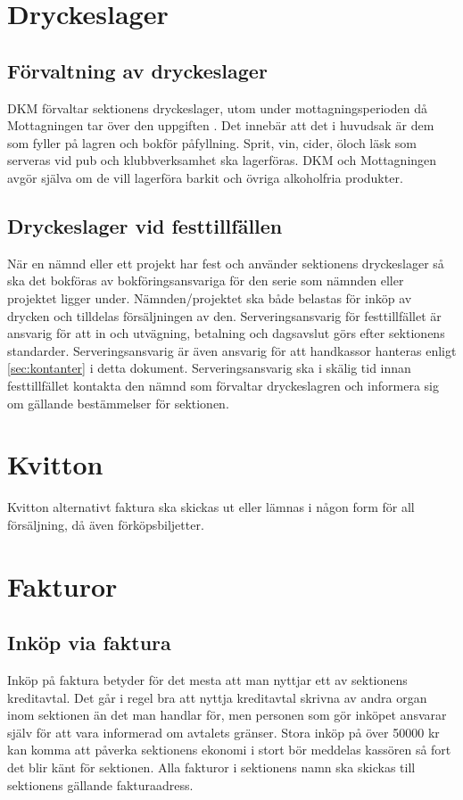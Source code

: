 \documentclass{dgovdoc}
\begin{document}
\section{Dryckeslager}
\subsection{Förvaltning av dryckeslager}
DKM förvaltar sektionens dryckeslager, utom under mottagningsperioden då Mottagningen tar över den
uppgiften . Det innebär att det i huvudsak är dem som fyller på lagren och bokför påfyllning. Sprit,
vin, cider, öloch läsk som serveras vid pub­ och klubbverksamhet ska lagerföras. DKM och Mottagningen avgör själva
om de vill lagerföra barkit och övriga alkoholfria produkter.

\subsection{Dryckeslager vid festtillfällen}
När en nämnd eller ett projekt har fest och använder sektionens dryckeslager så ska det bokföras av
bokföringsansvariga för den serie som nämnden eller projektet ligger under. Nämnden/projektet ska både
belastas för inköp av drycken och tilldelas försäljningen av den. Serveringsansvarig för festtillfället är
ansvarig för att in­ och ut­vägning, betalning och dagsavslut görs efter sektionens standarder.
Serveringsansvarig är även ansvarig för att handkassor hanteras enligt \ref{sec:kontanter} i detta dokument.
Serveringsansvarig ska i skälig tid innan festtillfället kontakta den nämnd som förvaltar dryckeslagren och
informera sig om gällande bestämmelser för sektionen.

\section{Kvitton}

Kvitton alternativt faktura ska skickas ut eller lämnas i någon form för all
försäljning, då även förköpsbiljetter.

\section{Fakturor}

\subsection{Inköp via faktura}
Inköp på faktura betyder för det mesta att man nyttjar ett av sektionens kreditavtal. Det går i regel bra att
nyttja kreditavtal skrivna av andra organ inom sektionen än det man handlar för, men personen som gör
inköpet ansvarar själv för att vara informerad om avtalets gränser. Stora inköp på över 50000 kr kan komma
att påverka sektionens ekonomi i stort bör meddelas kassören så fort det blir känt för sektionen. Alla fakturor
i sektionens namn ska skickas till sektionens gällande fakturaadress.
\end{document}
